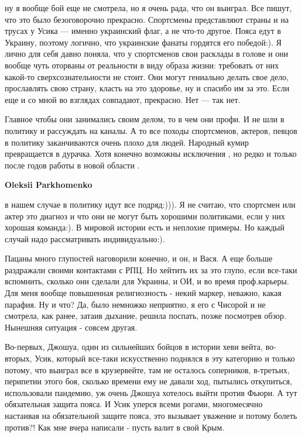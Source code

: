 \begin{itemize}
\begin{itemize}
ну я вообще бой еще не смотрела, но я очень рада, что он выиграл. Все пишут,
что это было безоговорочно прекрасно. Спортсмены представляют страны и на
трусах у Усика — именно украинский флаг, а не что-то другое. Пояса едут в
Украину, поэтому логично, что украинские фанаты гордятся его победой:). Я лично
для себя давно поняла, что у спортсменов свои расклады в голове и они вообще
чуть оторваны от реальности в виду образа жизни: требовать от них какой-то
сверхсознательности не стоит. Они могут гениально делать свое дело, прославлять
свою страну, класть на это здоровье, ну и спасибо им за это. Если еще и со мной
во взглядах совпадают, прекрасно. Нет — так нет.


Главное чтобы они занимались своим делом, то в чем они профи. И не шли в
политику и рассуждать на каналы. А то все походы спортсменов, актеров, певцов в
политику заканчиваются очень плохо для людей. Народный кумир превращается в
дурачка. Хотя конечно возможны исключения , но редко и только после годов
работы в новой области .

\textbf{Oleksii Parkhomenko} 

в нашем случае в политику идут все подряд:))). Я не считаю, что спортсмен или
актер это диагноз и что они не могут быть хорошими политиками, если у них
хорошая команда:). В мировой истории есть и неплохие примеры. Но каждый случай
надо рассматривать индивидуально:).

\end{itemize} %


Пацаны много глупостей наговорили конечно, и он, и Вася. А еще больше
раздражали своими контактами с РПЦ. Но хейтить их за это глупо, если все-таки
вспомнить, сколько они сделали для Украины, и ОИ, и во время проф.карьеры. Для
меня вообще повышенная религиозность - некий маркер, неважно, какая парафия. Ну
и что? Да, было немножко неприятно, я его с Чисорой и не смотрела, как ранее,
затаив дыхание, решила поспать, позже посмотрев обзор. Нынешняя ситуация -
совсем другая. 

Во-первых, Джошуа, один из сильнейших бойцов в истории хеви вейта, во-вторых,
Усик, который все-таки искусственно поднялся в эту категорию и только потому,
что выиграл все в крузервейте, там не осталось соперников, в-третьих, перипетии
этого боя, сколько времени ему не давали ход, пытылись откупиться, использовали
пандемию, уж очень Джошуа хотелось выйти против Фьюри.  А тут обязательная
защита пояса. И Усик уперся всеми рогами, многомесячно настаивая на
обязательной защите пояса, это вызывает уважение и потому болеть против?! Как
мне вчера написали - пусть валит в свой Крым. 


\end{itemize}
